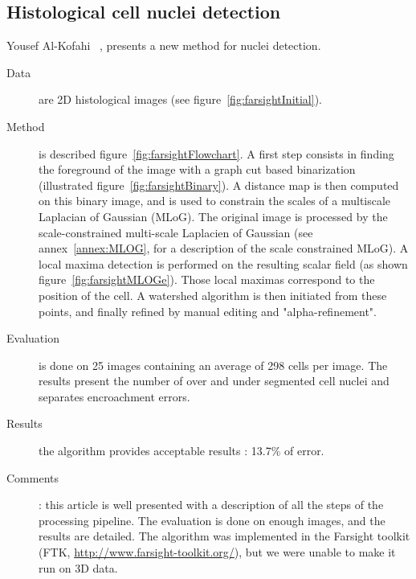 \clearpage

\subsection*{Histological cell nuclei detection}
\label{sect:farsight}
Yousef Al-Kofahi {\etal}~\cite{al2009improved}, presents a new method for nuclei detection.
  \begin{description}
  \item[Data] are 2D histological images (see figure~\ref{fig:farsightInitial}).
  \item[Method] is described figure~\ref{fig:farsightFlowchart}.
  A first step consists in finding the foreground of the image with a graph cut based binarization (illustrated figure~\ref{fig:farsightBinary}).
  A distance map is then computed on this binary image, and is used to constrain the scales of a multiscale Laplacian of Gaussian (MLoG).
  The original image is processed by the scale-constrained multi-scale Laplacien of Gaussian (see annex~\ref{annex:MLOG}, for a description of the scale constrained MLoG).
  A local maxima detection is performed on the resulting scalar field (as shown figure~\ref{fig:farsightMLOGe}).
  Those local maximas correspond to the position of the cell.
  A watershed algorithm is then initiated from these points, and finally refined by manual editing and "alpha-refinement".
  \item[Evaluation] is done on 25 images containing an average of 298 cells per image. The results present the number of over and under segmented cell nuclei and separates encroachment errors.
  \item[Results] the algorithm provides acceptable results : 13.7\% of error.
  \item[Comments]: this article is well presented with a description of all the steps of the processing pipeline.
  The evaluation is done on enough images, and the results are detailed.
  The algorithm was implemented in the Farsight toolkit (FTK, \url{http://www.farsight-toolkit.org/}), but we were unable to make it run on 3D data.
\end{description}
